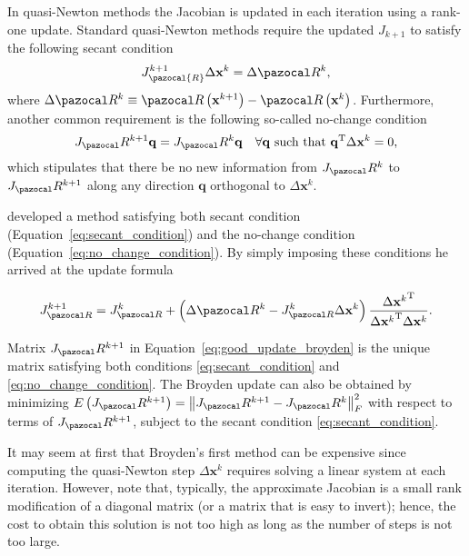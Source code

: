 In quasi-Newton methods the Jacobian is updated in each iteration using a rank-one update.
Standard quasi-Newton methods require the updated \(J_{k+1}\) to satisfy the following secant condition
\begin{equation} \label{eq:secant_condition}
J_\pazocal{R}^{k+1} \Delta \mathbf x^{k}=\Delta \pazocal R^{k},
\end{equation}
where \(\Delta \pazocal R^{k}\equiv \pazocal R\left(\mathbf x^{k+1}\right)-\pazocal R\left(\mathbf x^ {k}\right)\).
Furthermore, another common requirement is the following so-called no-change condition
\begin{equation} \label{eq:no_change_condition}
J_\pazocal R^{k+1} \mathbf q=J_\pazocal R^{k} \mathbf q \quad \forall \mathbf q \text { such that } \mathbf q^{\mathrm{T}} \Delta \mathbf x^{k}=0,
\end{equation}
which stipulates that there be no new information from \(J_\pazocal R^{k}\) to \(J_\pazocal R^{k+1}\) along any direction \(\mathbf q\) orthogonal to \(\Delta \mathbf x^{k}\).

\cite{broyden} developed a method satisfying both secant condition (Equation~\eqref{eq:secant_condition}) and the no-change condition (Equation~\eqref{eq:no_change_condition}).
By simply imposing these conditions he arrived at the update formula
\begin{highlight}
\begin{equation} \label{eq:good_update_broyden}
J_{\pazocal R}^{k+1}=J_{\pazocal R}^{k}+\left(\Delta \pazocal R^{k}-J_{\pazocal R}^{k} \Delta \mathbf x^{k}\right) \frac{\Delta {\mathbf x^{k}}^{\mathrm{T}}}{\Delta {\mathbf x^{k}}^{\mathrm{T}} \Delta \mathbf x^{k}}.
\end{equation}
\end{highlight}

Matrix \(J_\pazocal R^{k+1}\) in Equation~\eqref{eq:good_update_broyden} is the unique matrix satisfying both conditions \eqref{eq:secant_condition} and \eqref{eq:no_change_condition}.
The Broyden update can also be obtained by minimizing \(E\left(J_\pazocal R^{k+1}\right)=\left\|J_\pazocal R^{k+1}-J_\pazocal R^{k}\right\|_{F}^{2}\) with respect to terms of \(J_\pazocal R^{k+1}\), subject to the secant condition \eqref{eq:secant_condition}.

It may seem at first that Broyden's first method can be expensive since computing the quasi-Newton step \(\Delta \mathbf x^{k}\) requires solving a linear system at each iteration.
However, note that, typically, the approximate Jacobian is a small rank modification of a diagonal matrix (or a matrix that is easy to invert); hence, the cost to obtain this solution is not too high as long as the number of steps is not too large.

